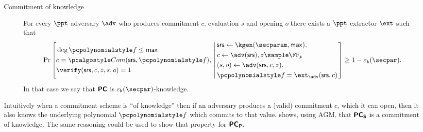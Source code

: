 \documentclass[runningheads,11pt]{llncs}
\begin{document}
\begin{description}
\item[Commitment of knowledge]  For every $\ppt$ adversary $\adv$ who produces
  commitment $c$, evaluation $s$ and opening $o$ there
  exists a $\ppt$ extractor $\ext$ such that
\[
  \Pr \left[
    \begin{aligned}
      & \deg \p{f} \leq \maxdeg\\
      & c = \com(\srs, \p{f}),\\
      & \verify(\srs, c, z, s, o) = 1
    \end{aligned}
    \,\left|\,
      \vphantom{
        \begin{aligned}
          & \\
          & \\
          &
        \end{aligned}
        }
    \begin{aligned}
      & \srs \gets \kgen(\secparam, \maxdeg),\\
      & c \gets \adv(\srs),
      z \sample \FF_p \\
      & (s, o) \gets \adv(\srs, c, z), \\
      & \p{f} = \ext_\adv(\srs, c)\\
    \end{aligned}
  \right.\right]
  \geq 1 - \epsk(\secpar).
\]
In that case we say that $\bm{\mathsf{PC}}$ is $\epsk(\secpar)$-knowledge.
\end{description}
Intuitively when a commitment scheme is ``of knowledge'' then if an
adversary produces a (valid) commitment $c$, which it can open, then it also
knows the underlying polynomial $\p{f}$ which commits to that value.
\cite{CCS:MBKM19} shows, using AGM, that $\bm{\mathsf{PC}}_{\bm{\mathsf{S}}}$ is a commitment of knowledge.
The same reasoning could be used to show that property for $\bm{\mathsf{PC}}_{\bm{\mathsf{P}}}$.
\end{document}
